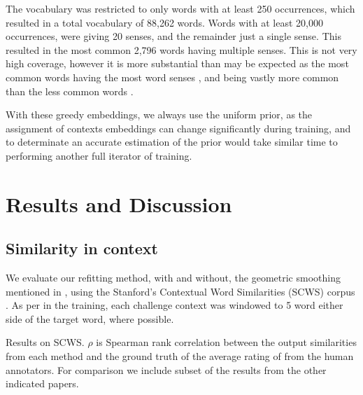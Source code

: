 \documentclass{sig-alternate}
\begin{document}
The vocabulary was restricted to only words with at least 250 occurrences, which resulted in a total vocabulary of 88,262 words. Words with at least 20,000 occurrences, were giving 20 senses, and the remainder just a single sense. This resulted in the most common 2,796 words having multiple senses. This is not very high coverage, however it is more substantial than may be expected as the most common words having the most word senses \parencite{zipf1945meaning}, and being vastly more common than the less common words \parencite{zipf1949human,gilmour2005understanding}.

With these greedy embeddings, we always use the uniform prior, as the assignment of contexts embeddings can change significantly during training, and to determinate an accurate estimation of the prior would take similar time to performing another full iterator of training.


\section{Results and Discussion} \label{results}


\subsection{Similarity in context}

We evaluate our refitting method, with and without, the geometric smoothing mentioned in , using the Stanford's Contextual Word Similarities (SCWS) corpus \parencite{Huang2012}.
As per in the training, each challenge context was windowed to 5 word either side of the target word, where possible.


\begin{table*}

\caption{Results on SCWS. $\rho$ is Spearman rank correlation between the output similarities from each method and the ground truth of the average rating of from the human annotators. For comparison we include subset of the results from the other indicated papers. } \label{swscres}
\end{table*}
\end{document}
